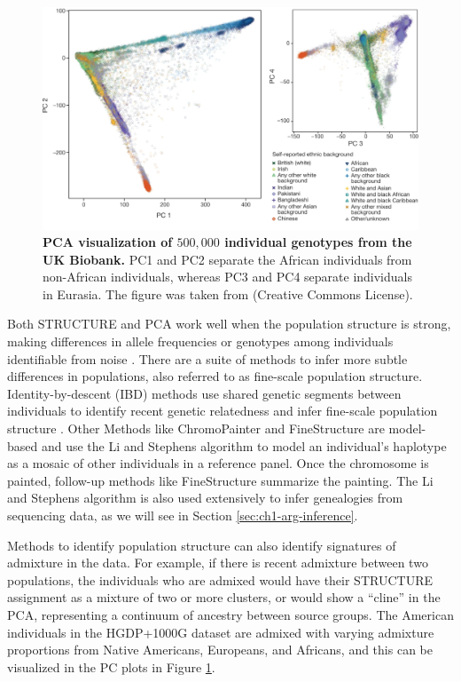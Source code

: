\begin{figure}[h!]
    \centering
    \includegraphics[width=\linewidth]{figures/thesis_pc_plot.pdf}
    \caption{\textbf{PCA visualization of $500,000$ individual genotypes from the UK Biobank.} PC1 and PC2 separate the African individuals from non-African individuals, whereas PC3 and PC4 separate individuals in Eurasia. The figure was taken from \cite{bycroft2018uk} (Creative Commons License).}
    \label{fig:pc_plot}
\end{figure}

Both STRUCTURE and PCA work well when the population structure is strong, making differences in allele frequencies or genotypes among individuals identifiable from noise \cite{Patterson2006}. There are a suite of methods to infer more subtle differences in populations, also referred to as fine-scale population structure. Identity-by-descent (IBD) methods use shared genetic segments between individuals to identify recent genetic relatedness and infer fine-scale population structure \cite{nait2020identity}. Other Methods like ChromoPainter and FineStructure \cite{Lawson2012} are model-based and use the Li and Stephens \cite{Li2003} algorithm to model an individual's haplotype as a mosaic of other individuals in a reference panel. Once the chromosome is painted, follow-up methods like FineStructure summarize the painting. The Li and Stephens algorithm is also used extensively to infer genealogies from sequencing data, as we will see in Section \ref{sec:ch1-arg-inference}.

Methods to identify population structure can also identify signatures of admixture in the data. For example, if there is recent admixture between two populations, the individuals who are admixed would have their STRUCTURE assignment as a mixture of two or more clusters, or would show a ``cline'' in the PCA, representing a continuum of ancestry between source groups. The American individuals in the HGDP+1000G dataset are admixed with varying admixture proportions from Native Americans, Europeans, and Africans, and this can be visualized in the PC plots in Figure \ref{fig:pc_plot}.

